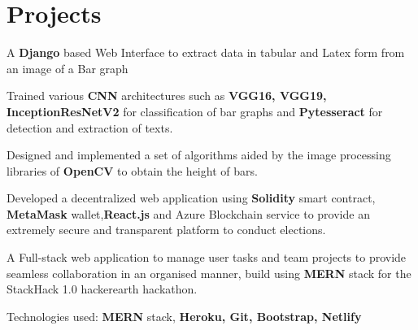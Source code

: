 \documentclass[]{deedy-resume-openfont}
\begin{document}
\begin{minipage}[t]{0.63\textwidth}


\section{Projects}

\vspace{\topsep} %
\begin{tightemize}
\item {A \textbf{Django} based Web Interface to extract data in tabular and Latex form from an image of a Bar graph} 
\item Trained various \textbf{CNN} architectures such as \textbf{VGG16, VGG19, InceptionResNetV2} for classification of bar graphs and \textbf{Pytesseract} for detection and extraction of texts.
\item Designed and implemented a set of algorithms aided by the image processing libraries of \textbf{OpenCV} to obtain the height of bars.
\end{tightemize}
\sectionsep

\begin{tightemize}
\item Developed a decentralized web application using \textbf{Solidity} smart contract, \textbf{MetaMask} wallet,\textbf{React.js} and Azure Blockchain service to provide an extremely secure and transparent platform to conduct elections.
\end{tightemize}

\begin{tightemize}
\item A Full-stack web application to manage user tasks and team projects to provide seamless collaboration in an organised manner, build using \textbf{MERN} stack for the StackHack 1.0 hackerearth hackathon.
\item Technologies used: \textbf{MERN} stack, \textbf{Heroku, Git, Bootstrap, Netlify}
\end{tightemize}


\end{minipage}
\end{document}
